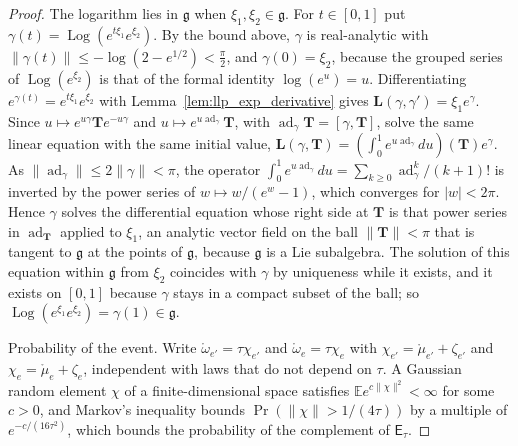 \begin{proof}
The logarithm lies in $\mathfrak g$ when $\xi_1,\xi_2\in\mathfrak g$. For $t\in[0,1]$ put $\gamma(t)=\operatorname{Log}(e^{t\xi_1}e^{\xi_2})$. By the bound above, $\gamma$ is real-analytic with $\|\gamma(t)\|\leq-\log(2-e^{1/2})<\frac\pi2$, and $\gamma(0)=\xi_2$, because the grouped series of $\operatorname{Log}(e^{\xi_2})$ is that of the formal identity $\log(e^u)=u$. Differentiating $e^{\gamma(t)}=e^{t\xi_1}e^{\xi_2}$ with Lemma~\ref{lem:llp_exp_derivative} gives $\mathbf L(\gamma,\gamma')=\xi_1e^\gamma$. Since $u\mapsto e^{u\gamma}\mathbf Te^{-u\gamma}$ and $u\mapsto e^{u\operatorname{ad}_\gamma}\mathbf T$, with $\operatorname{ad}_\gamma\mathbf T=[\gamma,\mathbf T]$, solve the same linear equation with the same initial value, $\mathbf L(\gamma,\mathbf T)=(\int_0^1e^{u\operatorname{ad}_\gamma}du)(\mathbf T)e^\gamma$. As $\|\operatorname{ad}_\gamma\|\leq2\|\gamma\|<\pi$, the operator $\int_0^1e^{u\operatorname{ad}_\gamma}du=\sum_{k\geq0}\operatorname{ad}_\gamma^k/(k+1)!$ is inverted by the power series of $w\mapsto w/(e^w-1)$, which converges for $|w|<2\pi$. Hence $\gamma$ solves the differential equation whose right side at $\mathbf T$ is that power series in $\operatorname{ad}_{\mathbf T}$ applied to $\xi_1$, an analytic vector field on the ball $\|\mathbf T\|<\pi$ that is tangent to $\mathfrak g$ at the points of $\mathfrak g$, because $\mathfrak g$ is a Lie subalgebra. The solution of this equation within $\mathfrak g$ from $\xi_2$ coincides with $\gamma$ by uniqueness while it exists, and it exists on $[0,1]$ because $\gamma$ stays in a compact subset of the ball; so $\operatorname{Log}(e^{\xi_1}e^{\xi_2})=\gamma(1)\in\mathfrak g$.

Probability of the event. Write $\mathring\omega_{e'}=\tau\chi_{e'}$ and $\mathring\omega_e=\tau\chi_e$ with $\chi_{e'}=\mathring\mu_{e'}+\zeta_{e'}$ and $\chi_e=\mathring\mu_e+\zeta_e$, independent with laws that do not depend on $\tau$. A Gaussian random element $\chi$ of a finite-dimensional space satisfies $\mathbb Ee^{c\|\chi\|^2}<\infty$ for some $c>0$, and Markov's inequality bounds $\Pr(\|\chi\|>1/(4\tau))$ by a multiple of $e^{-c/(16\tau^2)}$, which bounds the probability of the complement of $\mathsf E_\tau$.


\end{proof}
